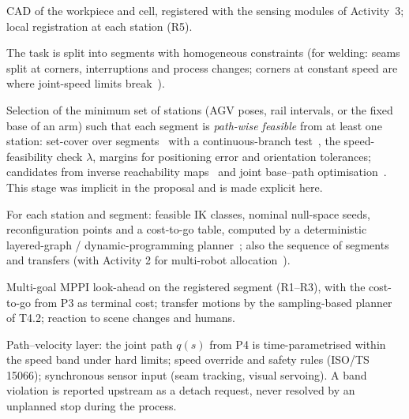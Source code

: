 \documentclass[10pt,a4paper]{article}
\begin{document}
\begin{description}[leftmargin=0pt]
\item[P0 -- Scene and task model.] CAD of the workpiece and cell, registered with the sensing modules of Activity~3; local registration at each station (R5).
\item[P1 -- Task segmentation.] The task is split into segments with homogeneous constraints (for welding: seams split at corners, interruptions and process changes; corners at constant speed are where joint-speed limits break~\cite{gautier2024weldingbase}).
\item[P2 -- Optimal task localisation.] Selection of the minimum set of stations (AGV poses, rail intervals, or the fixed base of an arm) such that each segment is \emph{path-wise feasible} from at least one station: set-cover over segments~\cite{nguyen2023taskclustering} with a continuous-branch test~\cite{weingartshofer2021tcpbase}, the speed-feasibility check $\lambda$, margins for positioning error and orientation tolerances; candidates from inverse reachability maps~\cite{makhal2018reuleaux} and joint base--path optimisation~\cite{zhao2025bstar}. This stage was implicit in the proposal and is made explicit here.
\item[P3 -- Segment feasibility and cost-to-go.] For each station and segment: feasible IK classes, nominal null-space seeds, reconfiguration points and a cost-to-go table, computed by a deterministic layered-graph / dynamic-programming planner~\cite{yin2024dpbreakpoints,demaeyer2017descartes}; also the sequence of segments and transfers (with Activity 2 for multi-robot allocation~\cite{tang2023dualrobotweld}).
\item[P4 -- Online execution.] Multi-goal MPPI look-ahead on the registered segment (R1--R3), with the cost-to-go from P3 as terminal cost; transfer motions by the sampling-based planner of T4.2; reaction to scene changes and humans.
\item[P5 -- Core IPC.] Path--velocity layer: the joint path $q(s)$ from P4 is time-parametrised within the speed band under hard limits; speed override and safety rules (ISO/TS 15066); synchronous sensor input (seam tracking, visual servoing). A band violation is reported upstream as a detach request, never resolved by an unplanned stop during the process.
\end{description}

\end{document}
